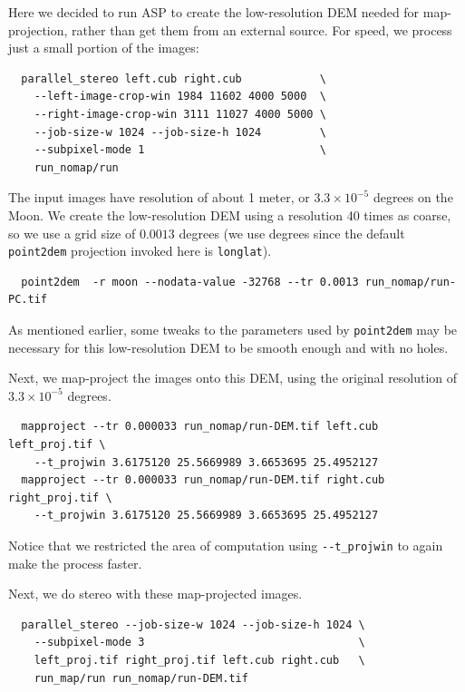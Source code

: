 Here we decided to run ASP to create the low-resolution DEM needed for
map-projection, rather than get them from an external source. For speed,
we process just a small portion of the images:

\begin{verbatim}
  parallel_stereo left.cub right.cub            \
    --left-image-crop-win 1984 11602 4000 5000  \
    --right-image-crop-win 3111 11027 4000 5000 \
    --job-size-w 1024 --job-size-h 1024         \
    --subpixel-mode 1                           \
    run_nomap/run
\end{verbatim}

The input images have resolution of about 1 meter, or $3.3 \times
10^{-5}$ degrees on the Moon. We create the low-resolution DEM using a
resolution 40 times as coarse, so we use a grid size of $0.0013$ degrees
(we use degrees since the default \texttt{point2dem} projection invoked
here is \texttt{longlat}).

\begin{verbatim}
  point2dem  -r moon --nodata-value -32768 --tr 0.0013 run_nomap/run-PC.tif
\end{verbatim}

As mentioned earlier, some tweaks to the parameters used by \texttt{point2dem}
may be necessary for this low-resolution DEM to be smooth enough and
with no holes.

Next, we map-project the images onto this DEM, using the original resolution
of $3.3 \times 10^{-5}$ degrees.

\begin{verbatim}
  mapproject --tr 0.000033 run_nomap/run-DEM.tif left.cub left_proj.tif \
    --t_projwin 3.6175120 25.5669989 3.6653695 25.4952127
  mapproject --tr 0.000033 run_nomap/run-DEM.tif right.cub right_proj.tif \
    --t_projwin 3.6175120 25.5669989 3.6653695 25.4952127
\end{verbatim}

Notice that we restricted the area of computation using \texttt{-\/-t\_projwin}
to again make the process faster.

Next, we do stereo with these map-projected images.

\begin{verbatim}
  parallel_stereo --job-size-w 1024 --job-size-h 1024 \
    --subpixel-mode 3                                 \
    left_proj.tif right_proj.tif left.cub right.cub   \
    run_map/run run_nomap/run-DEM.tif
\end{verbatim}

